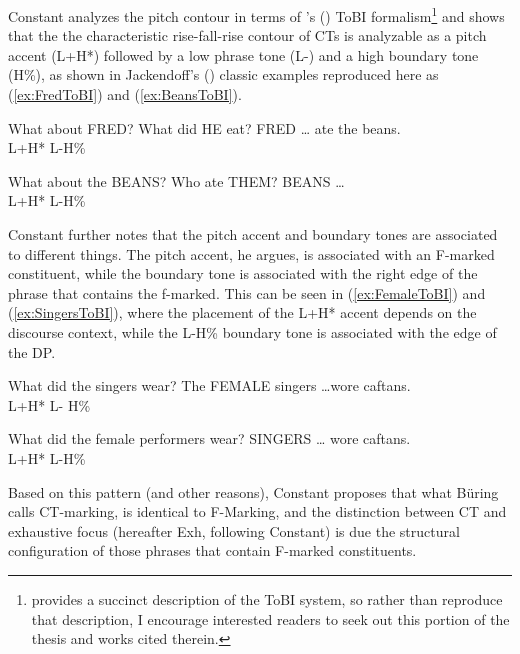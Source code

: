 \documentclass[
]{RCL}
\begin{document}
Constant analyzes the pitch contour in terms of \citeauthor{pierrehumbert1990meaning}'s (\citeyear{pierrehumbert1990meaning}) ToBI formalism\footnote{\citet[14--16]{constant2014diss} provides a succinct description of the ToBI system, so rather than reproduce that description, I encourage interested readers to seek out this portion of the thesis and works cited therein.} and shows that the the characteristic rise-fall-rise contour of CTs is analyzable as a pitch accent (L+H*) followed by a low phrase tone (L-) and a high boundary tone (H\%), as shown in Jackendoff's (\citeyear{jackendoff1972semantics}) classic examples reproduced here as (\ref{ex:FredToBI}) and (\ref{ex:BeansToBI}).
\begin{exe}
\ex\label{ex:FredToBI}
\begin{xlist}
	 What about FRED? What did HE eat?
	\gll FRED {\ldots} {ate the beans.}\\
	L+H* L-H\% {}\\
\end{xlist}
\ex\label{ex:BeansToBI}
\begin{xlist}
 What about the BEANS? Who ate THEM?
 BEANS \ldots\\
{} L+H* L-H\%\\	
\end{xlist}	
\end{exe}

Constant further notes that the pitch accent and boundary tones are associated to different things.
The pitch accent, he argues, is associated with an F-marked constituent, while the boundary tone is associated with the right edge of the phrase that contains the f-marked.
This can be seen in (\ref{ex:FemaleToBI}) and (\ref{ex:SingersToBI}), where the placement of the L+H* accent depends on the discourse context, while the L-H\% boundary tone is associated with the edge of the DP.
\begin{exe}
\ex\label{ex:FemaleToBI}
\begin{xlist}
	 What did the singers wear?
	\gll The {\hspace{1em}FEMALE} singers \ldots {wore caftans.}\\
	{} L+H* {\hspace{2em}L-} H\% {}\\
\end{xlist}
\ex\label{ex:SingersToBI}
\begin{xlist}
	 What did the female performers wear?
	 {\hspace{1em}SINGERS} {\hspace{1em}\ldots} {wore caftans.}\\
	{} L+H* L-H\% {}\\	
\end{xlist}	
\end{exe}
Based on this pattern (and other reasons), Constant proposes that what B\"uring calls CT-marking, is identical to F-Marking, and the distinction between CT and exhaustive focus (hereafter Exh, following Constant) is due the structural configuration of those phrases that contain F-marked constituents.
\end{document}

